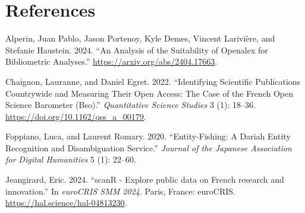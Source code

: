 \documentclass[
]{article}
\newlength{\cslhangindent}
\newenvironment{cslreferences}%
  {\setlength{\parindent}{0pt}%
  \everypar{\setlength{\hangindent}{\cslhangindent}}\ignorespaces}%
  {\par}
\begin{document}
\hypertarget{references}{%
\section*{References}\label{references}}

\hypertarget{refs}{}
\begin{cslreferences}
\leavevmode\hypertarget{ref-alperin2024analysissuitabilityopenalexbibliometric}{}%
Alperin, Juan Pablo, Jason Portenoy, Kyle Demes, Vincent Larivière, and
Stefanie Haustein. 2024. ``An Analysis of the Suitability of Openalex
for Bibliometric Analyses.'' \url{https://arxiv.org/abs/2404.17663}.

\leavevmode\hypertarget{ref-10.1162ux2fqss_a_00179}{}%
Chaignon, Lauranne, and Daniel Egret. 2022. ``Identifying Scientific
Publications Countrywide and Measuring Their Open Access: The Case of
the French Open Science Barometer (Bso).'' \emph{Quantitative Science
Studies} 3 (1): 18--36. \url{https://doi.org/10.1162/qss_a_00179}.

\leavevmode\hypertarget{ref-foppiano2020entity}{}%
Foppiano, Luca, and Laurent Romary. 2020. ``Entity-Fishing: A Dariah
Entity Recognition and Disambiguation Service.'' \emph{Journal of the
Japanese Association for Digital Humanities} 5 (1): 22--60.

\leavevmode\hypertarget{ref-jeangirard:hal-04813230}{}%
Jeangirard, Eric. 2024. ``scanR - Explore public data on French research
and innovation.'' In \emph{euroCRIS SMM 2024}. Paris, France: euroCRIS.
\url{https://hal.science/hal-04813230}.
\end{cslreferences}
\end{document}
